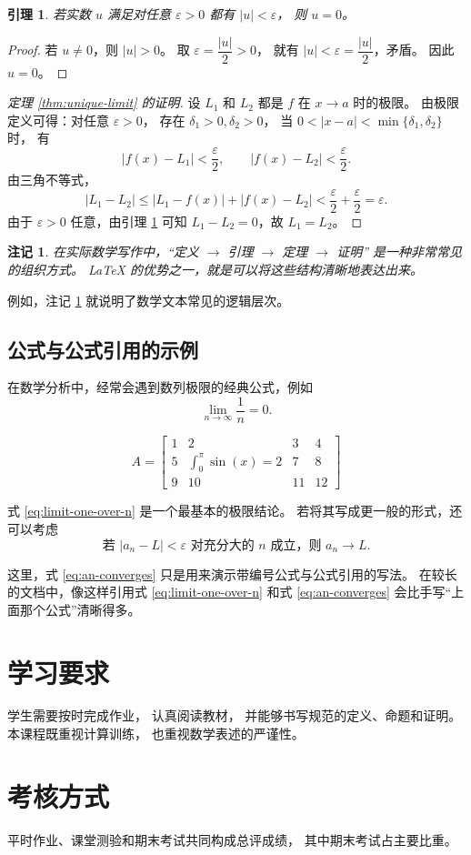 \documentclass[UTF8]{ctexart}
\newtheorem{lemma}[theorem]{引理}
\newtheorem{remark}{注记}[section]
\numberwithin{equation}{section}
\begin{document}
\begin{lemma}\label{lem:abs-zero}
若实数 $u$ 满足对任意 $\varepsilon>0$ 都有 $|u|<\varepsilon$，
则 $u=0$。
\end{lemma}

\begin{proof}
若 $u\neq 0$，则 $|u|>0$。
取 $\varepsilon=\dfrac{|u|}{2}>0$，
就有 $|u|<\varepsilon=\dfrac{|u|}{2}$，矛盾。
因此 $u=0$。
\end{proof}

\begin{proof}[定理 \ref{thm:unique-limit} 的证明]
设 $L_1$ 和 $L_2$ 都是 $f$ 在 $x\to a$ 时的极限。
由极限定义可得：对任意 $\varepsilon>0$，
存在 $\delta_1>0,\delta_2>0$，
当 $0<|x-a|<\min\{\delta_1,\delta_2\}$ 时，
有
\[
|f(x)-L_1|<\frac{\varepsilon}{2},
\qquad
|f(x)-L_2|<\frac{\varepsilon}{2}.
\]
由三角不等式，
\[
|L_1-L_2|
\le |L_1-f(x)|+|f(x)-L_2|
< \frac{\varepsilon}{2}+\frac{\varepsilon}{2}
= \varepsilon.
\]
由于 $\varepsilon>0$ 任意，由引理 \ref{lem:abs-zero} 可知
$L_1-L_2=0$，故 $L_1=L_2$。
\end{proof}

\begin{remark}\label{rem:structure}
在实际数学写作中，“定义 $\to$ 引理 $\to$ 定理 $\to$ 证明”
是一种非常常见的组织方式。
LaTeX 的优势之一，就是可以将这些结构清晰地表达出来。
\end{remark}

例如，注记 \ref{rem:structure} 就说明了数学文本常见的逻辑层次。

\subsection{公式与公式引用的示例}

在数学分析中，经常会遇到数列极限的经典公式，例如
\begin{equation}\label{eq:limit-one-over-n}
\lim_{n\to\infty}\frac{1}{n}=0.
\end{equation}

$$
A = \left[
\begin{array}{cccc}
  1 & 2 & 3 & 4 \\
  5 & \int_0^\pi \sin(x) = 2  & 7 & 8 \\
  9 & 10 & 11 & 12
\end{array}
\right]
$$

式 \eqref{eq:limit-one-over-n} 是一个最基本的极限结论。
若将其写成更一般的形式，还可以考虑
\begin{equation}\label{eq:an-converges}
\text{若 } |a_n-L|<\varepsilon \text{ 对充分大的 } n \text{ 成立，则 } a_n\to L.
\end{equation}

这里，式 \eqref{eq:an-converges} 只是用来演示带编号公式与公式引用的写法。
在较长的文档中，像这样引用式 \eqref{eq:limit-one-over-n} 和式 \eqref{eq:an-converges}
会比手写“上面那个公式”清晰得多。

\section{学习要求}

学生需要按时完成作业，
认真阅读教材，
并能够书写规范的定义、命题和证明。
本课程既重视计算训练，
也重视数学表述的严谨性。

\section{考核方式}

平时作业、课堂测验和期末考试共同构成总评成绩，
其中期末考试占主要比重。
\end{document}
